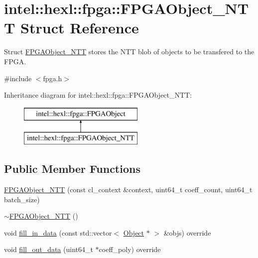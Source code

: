\hypertarget{structintel_1_1hexl_1_1fpga_1_1FPGAObject__NTT}{\section{intel\-:\-:hexl\-:\-:fpga\-:\-:F\-P\-G\-A\-Object\-\_\-\-N\-T\-T Struct Reference}
\label{structintel_1_1hexl_1_1fpga_1_1FPGAObject__NTT}
}


Struct \hyperlink{structintel_1_1hexl_1_1fpga_1_1FPGAObject__NTT}{F\-P\-G\-A\-Object\-\_\-\-N\-T\-T} stores the N\-T\-T blob of objects to be transfered to the F\-P\-G\-A.  




{\ttfamily \#include $<$fpga.\-h$>$}

Inheritance diagram for intel\-:\-:hexl\-:\-:fpga\-:\-:F\-P\-G\-A\-Object\-\_\-\-N\-T\-T\-:\begin{figure}[H]
\begin{center}
\leavevmode
\includegraphics[height=2.000000cm]{structintel_1_1hexl_1_1fpga_1_1FPGAObject__NTT}
\end{center}
\end{figure}
\subsection*{Public Member Functions}
\begin{DoxyCompactItemize}
\item 
\hyperlink{structintel_1_1hexl_1_1fpga_1_1FPGAObject__NTT_a0ea057e0cc2e3a1b13917ac8f1bd1af3}{F\-P\-G\-A\-Object\-\_\-\-N\-T\-T} (const cl\-\_\-context \&context, uint64\-\_\-t coeff\-\_\-count, uint64\-\_\-t batch\-\_\-size)
\item 
\hyperlink{structintel_1_1hexl_1_1fpga_1_1FPGAObject__NTT_abae77f82236fa240111b32bd1b665a21}{$\sim$\-F\-P\-G\-A\-Object\-\_\-\-N\-T\-T} ()
\item 
void \hyperlink{structintel_1_1hexl_1_1fpga_1_1FPGAObject__NTT_a3aa5e6c85ae154bcf98ba99205feda16}{fill\-\_\-in\-\_\-data} (const std\-::vector$<$ \hyperlink{structintel_1_1hexl_1_1fpga_1_1Object}{Object} $\ast$ $>$ \&objs) override
\item 
void \hyperlink{structintel_1_1hexl_1_1fpga_1_1FPGAObject__NTT_a4f31676fdaf820560f625d2f468da397}{fill\-\_\-out\-\_\-data} (uint64\-\_\-t $\ast$coeff\-\_\-poly) override
\end{DoxyCompactItemize}
